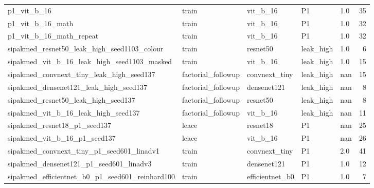 {\begin{longtable}{p{5.2cm}llllr}
p1\_\allowbreak{}vit\_\allowbreak{}b\_\allowbreak{}16 & train & vit\_b\_16 & P1 & 1.0 & 35 \\
p1\_\allowbreak{}vit\_\allowbreak{}b\_\allowbreak{}16\_\allowbreak{}math & train & vit\_b\_16 & P1 & 1.0 & 32 \\
p1\_\allowbreak{}vit\_\allowbreak{}b\_\allowbreak{}16\_\allowbreak{}math\_\allowbreak{}repeat & train & vit\_b\_16 & P1 & 1.0 & 32 \\
sipakmed\_\allowbreak{}resnet50\_\allowbreak{}leak\_\allowbreak{}high\_\allowbreak{}seed1103\_\allowbreak{}colour & train & resnet50 & leak\_high & 1.0 & 6 \\
sipakmed\_\allowbreak{}vit\_\allowbreak{}b\_\allowbreak{}16\_\allowbreak{}leak\_\allowbreak{}high\_\allowbreak{}seed1103\_\allowbreak{}masked & train & vit\_b\_16 & leak\_high & 1.0 & 15 \\
sipakmed\_\allowbreak{}convnext\_\allowbreak{}tiny\_\allowbreak{}leak\_\allowbreak{}high\_\allowbreak{}seed137 & factorial\_followup & convnext\_tiny & leak\_high & nan & 15 \\
sipakmed\_\allowbreak{}densenet121\_\allowbreak{}leak\_\allowbreak{}high\_\allowbreak{}seed137 & factorial\_followup & densenet121 & leak\_high & nan & 8 \\
sipakmed\_\allowbreak{}resnet50\_\allowbreak{}leak\_\allowbreak{}high\_\allowbreak{}seed137 & factorial\_followup & resnet50 & leak\_high & nan & 8 \\
sipakmed\_\allowbreak{}vit\_\allowbreak{}b\_\allowbreak{}16\_\allowbreak{}leak\_\allowbreak{}high\_\allowbreak{}seed137 & factorial\_followup & vit\_b\_16 & leak\_high & nan & 11 \\
sipakmed\_\allowbreak{}resnet18\_\allowbreak{}p1\_\allowbreak{}seed137 & leace & resnet18 & P1 & nan & 25 \\
sipakmed\_\allowbreak{}vit\_\allowbreak{}b\_\allowbreak{}16\_\allowbreak{}p1\_\allowbreak{}seed137 & leace & vit\_b\_16 & P1 & nan & 26 \\
sipakmed\_\allowbreak{}convnext\_\allowbreak{}tiny\_\allowbreak{}p1\_\allowbreak{}seed601\_\allowbreak{}linadv1 & train & convnext\_tiny & P1 & 2.0 & 41 \\
sipakmed\_\allowbreak{}densenet121\_\allowbreak{}p1\_\allowbreak{}seed601\_\allowbreak{}linadv3 & train & densenet121 & P1 & 1.0 & 12 \\
sipakmed\_\allowbreak{}efficientnet\_\allowbreak{}b0\_\allowbreak{}p1\_\allowbreak{}seed601\_\allowbreak{}reinhard100 & train & efficientnet\_b0 & P1 & 1.0 & 7 \\
\end{longtable}
}
